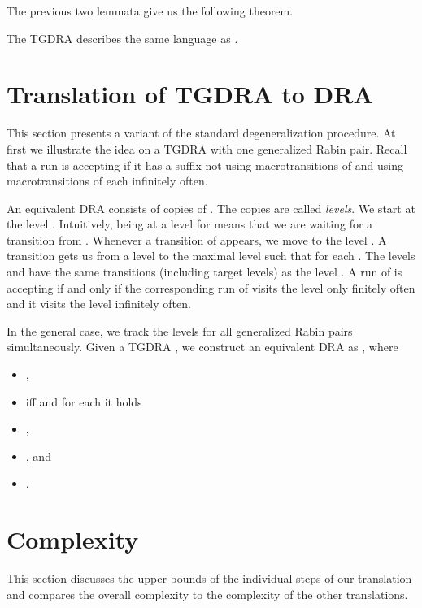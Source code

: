 \documentclass{llncs}
\begin{document}
The previous two lemmata give us the following theorem.
\begin{theorem}
The TGDRA  describes the same
language as .
\end{theorem}














\section{Translation of TGDRA to DRA}
This section presents a variant of the standard degeneralization procedure.  
At first we illustrate the idea on a TGDRA
 with one
generalized Rabin pair. Recall
that a run is accepting if it has a suffix not using macrotransitions of 
and using macrotransitions of each  infinitely often.

An equivalent DRA  consists of  copies of . The copies are
called \emph{levels}.  We start at the level .  Intuitively, being at a
level  for  means that we are waiting for a transition from
.  Whenever a transition of  appears, we move to the level .  A
transition  gets us from a level  to the maximal level  such that  for each . The levels  and 
have the same transitions (including target levels) as the level . A run
of  is accepting if and only if the corresponding run of  visits
the level  only finitely often and it visits the level  infinitely
often.





In the general case, we track the levels for all generalized Rabin pairs
simultaneously. Given a TGDRA
, we construct an equivalent DRA as , where
\begin{itemize}
\item ,
\item  
iff  and for each  it holds

\item ,
\item , and
\item .
\end{itemize}



\section{Complexity}

This section discusses the upper bounds of the individual steps of our
translation and compares the overall complexity to the complexity of the
other translations.
\end{document}
